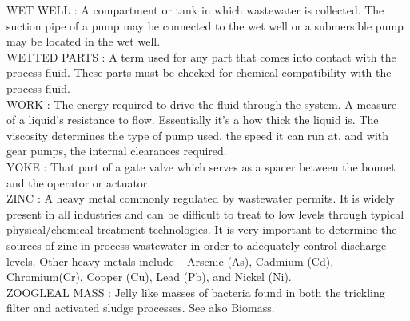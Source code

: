 WET WELL :  A compartment or tank in which wastewater is collected. The suction pipe of a pump may be connected to the wet well or a submersible pump may be located in the wet well.\\
\vspace{0.15cm}
WETTED PARTS :   A term used for any part that comes into contact with the process fluid. These parts must be checked for chemical compatibility with the process fluid.\\
\vspace{0.15cm}
WORK :   The energy required to drive the fluid through the system.  A measure of a liquid’s resistance to flow. Essentially it’s a how thick the liquid is. The viscosity determines the type of pump used, the speed it can run at, and with gear pumps, the internal clearances required.\\
\vspace{0.15cm}
YOKE :   That part of a gate valve which serves as a spacer between the bonnet and the operator or actuator.\\
\vspace{0.15cm}
ZINC :   A heavy metal commonly regulated by wastewater permits. It is widely present in all industries and can be difficult to treat to low levels through typical physical/chemical treatment technologies.  It is very important to determine the sources of zinc in process wastewater in order to adequately control discharge levels.  Other heavy metals include – Arsenic (As), Cadmium (Cd), Chromium(Cr), Copper (Cu), Lead (Pb), and Nickel (Ni).\\
\vspace{0.15cm}
ZOOGLEAL MASS :  Jelly like masses of bacteria found in both the trickling filter and activated sludge processes. See also Biomass.\\























